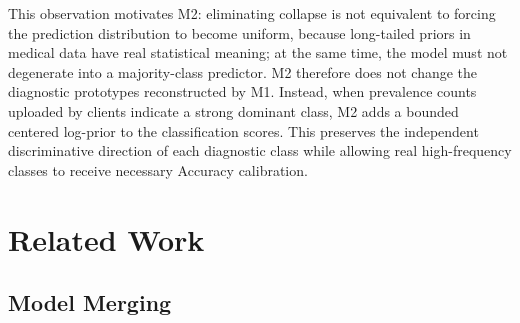 \documentclass[letterpaper]{article}
\begin{document}
This observation motivates M2: eliminating collapse is not equivalent to forcing the prediction distribution to become uniform, because long-tailed priors in medical data have real statistical meaning; at the same time, the model must not degenerate into a majority-class predictor. M2 therefore does not change the diagnostic prototypes reconstructed by M1. Instead, when prevalence counts uploaded by clients indicate a strong dominant class, M2 adds a bounded centered log-prior to the classification scores. This preserves the independent discriminative direction of each diagnostic class while allowing real high-frequency classes to receive necessary Accuracy calibration.


\section{Related Work}

\subsection{Model Merging}
\end{document}
